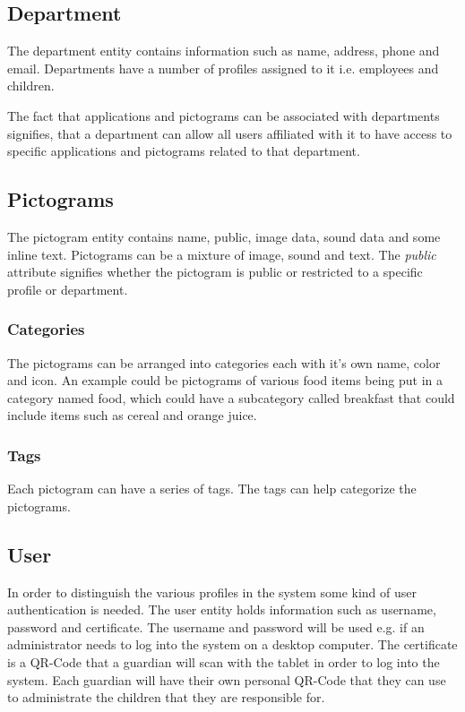 \subsection{Department}
The department entity contains information such as name, address, phone and email. Departments have a number of profiles assigned to it i.e. employees and children.

The fact that applications and pictograms can be associated with departments signifies, that a department can allow all users affiliated with it to have access to specific applications and pictograms related to that department.

\subsection{Pictograms}
The pictogram entity contains name, public, image data, sound data and some inline text. 
Pictograms can be a mixture of image, sound and text. The \emph{public} attribute signifies whether the pictogram is public or restricted to a specific profile or department. 

\subsubsection{Categories}
The pictograms can be arranged into categories each with it's own name, color and icon.
An example could be pictograms of various food items being put in a category named food, which could have a subcategory called breakfast that could include items such as cereal and orange juice.

\subsubsection{Tags}
Each pictogram can have a series of tags. The tags can help categorize the pictograms.

\subsection{User}
In order to distinguish the various profiles in the system some kind of user authentication is needed. The user entity holds information such as username, password and certificate.
The username and password will be used e.g. if an administrator needs to log into the system on a desktop computer. The certificate is a QR-Code that a guardian will scan with the tablet in order to log into the system. Each guardian will have their own personal QR-Code that they can use to administrate the children that they are responsible for.